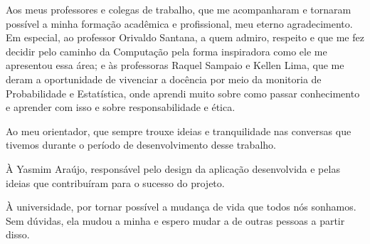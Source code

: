\begin{trivlist}
  \item Aos meus professores e colegas de trabalho, que me acompanharam e tornaram possível a minha formação acadêmica e profissional, meu eterno agradecimento. Em especial, ao professor Orivaldo Santana, a quem admiro, respeito e que me fez decidir pelo caminho da Computação pela forma inspiradora como ele me apresentou essa área; e às professoras Raquel Sampaio e Kellen Lima, que me deram a oportunidade de vivenciar a docência por meio da monitoria de Probabilidade e Estatística, onde aprendi muito sobre como passar conhecimento e aprender com isso e sobre responsabilidade e ética.

  \item Ao meu orientador, que sempre trouxe ideias e tranquilidade nas conversas que tivemos durante o período de desenvolvimento desse trabalho.

  \item À Yasmim Araújo, responsável pelo design da aplicação desenvolvida e pelas ideias que contribuíram para o sucesso do projeto.

  \item À universidade, por tornar possível a mudança de vida que todos nós sonhamos. Sem dúvidas, ela mudou a minha e espero mudar a de outras pessoas a partir disso.

\end{trivlist}
